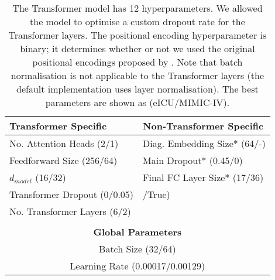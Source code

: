 \documentclass[sigconf]{acmart}
\begin{document}
\begin{table}[h]
  \caption{The Transformer model has 12 hyperparameters. We allowed the model to optimise a custom dropout rate for the Transformer layers. The positional encoding hyperparameter is binary; it determines whether or not we used the original positional encodings proposed by \citet{46201}. Note that batch normalisation is not applicable to the Transformer layers (the default implementation uses layer normalisation). The best parameters are shown as (eICU/MIMIC-IV).}
  \label{tab:Transformerhyperparams}
  \centering
  \begin{tabular}{ll}
    \toprule
    \textbf{Transformer Specific} & \textbf{Non-Transformer Specific} \\
    \midrule
    No. Attention Heads (2/1)&Diag. Embedding Size* (64/-)\\
    Feedforward Size (256/64)&Main Dropout* (0.45/0)\\
    $d_{model}$ (16/32)&Final FC Layer Size* (17/36)\\
    Transformer Dropout (0/0.05)& /True)\\
    No. Transformer Layers (6/2)&\\
    \vspace{-0.8em}\\
    \toprule
    \multicolumn{2}{c}{\textbf{Global Parameters}}\\
    \midrule
    \multicolumn{2}{c}{Batch Size (32/64)}\\
    \multicolumn{2}{c}{Learning Rate (0.00017/0.00129)}\\
    \bottomrule
  \end{tabular}
\end{table}
\end{document}
